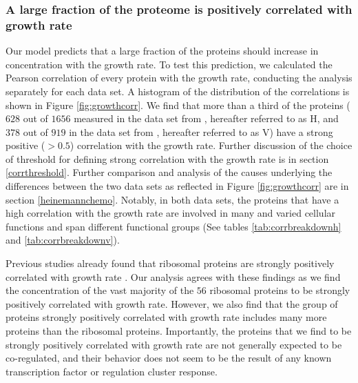 \subsubsection{A large fraction of the proteome is positively correlated with growth rate}
Our model predicts that a large fraction of the proteins should increase in concentration with the growth rate.
To test this prediction, we calculated the Pearson correlation of every protein with the growth rate, conducting the analysis separately for each data set.
A histogram of the distribution of the correlations is shown in Figure \ref{fig:growthcorr}.
We find that more than a third of the proteins ($628$ out of $1656$ measured in the data set from \cite{Heinemann2015}, hereafter referred to as H, and $378$ out of $919$ in the data set from \cite{Valgepea2013}, hereafter referred to as V) have a strong positive ($>0.5$) correlation with the growth rate.
Further discussion of the choice of threshold for defining strong correlation with the growth rate is in section \ref{corrthreshold}.
Further comparison and analysis of the causes underlying the differences between the two data sets as reflected in Figure \ref{fig:growthcorr} are in section \ref{heinemannchemo}.
Notably, in both data sets, the proteins that have a high correlation with the growth rate are involved in many and varied cellular functions and span different functional groups (See tables \ref{tab:corrbreakdownh} and \ref{tab:corrbreakdownv}).

Previous studies already found that ribosomal proteins are strongly positively correlated with growth rate \cite{Pedersen1978a, ingraham1983growth, Klumpp2008}.
Our analysis agrees with these findings as we find the concentration of the vast majority of the $56$ ribosomal proteins to be strongly positively correlated with growth rate.
However, we also find that the group of proteins strongly positively correlated with growth rate includes many more proteins than the ribosomal proteins.
Importantly, the proteins that we find to be strongly positively correlated with growth rate are not generally expected to be co-regulated, and their behavior does not seem to be the result of any known transcription factor or regulation cluster response.